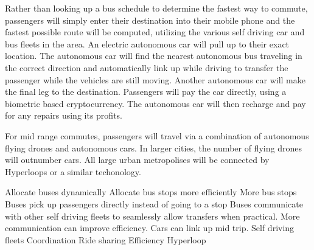 Rather than looking up a bus schedule to determine the fastest way to commute, passengers will simply enter their destination into their mobile phone and the fastest possible route will be computed, utilizing the various self driving car and bus fleets in the area.
An electric autonomous car will pull up to their exact location.
The autonomous car will find the nearest autonomous bus traveling in the correct direction and automatically link up while driving to transfer the passenger while the vehicles are still moving.
Another autonomous car will make the final leg to the destination.
Passengers will pay the car directly, using a biometric based cryptocurrency.
The autonomous car will then recharge and pay for any repairs using its profits.

For mid range commutes, passengers will travel via a combination of autonomous flying drones and autonomous cars.
In larger cities, the number of flying drones will outnumber cars.
All large urban metropolises will be connected by Hyperloops or a similar techonology.


Allocate buses dynamically
Allocate bus stops more efficiently
More bus stops
Buses pick up passengers directly instead of going to a stop
Buses communicate with other self driving fleets to seamlessly allow transfers when practical.
More communication can improve efficiency.
Cars can link up mid trip.
Self driving fleets
    Coordination
    Ride sharing
    Efficiency
Hyperloop
